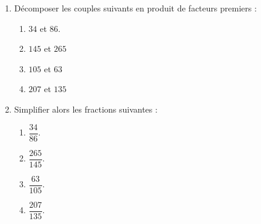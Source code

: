 \begin{exercice*}    
    \begin{enumerate}
        \item Décomposer les couples suivants en produit de facteurs premiers :
        \begin{multicols}{2}                
            \begin{enumerate}
                \item $34$ et $86$.
                \item $145$ et $265$
                \item $105$ et $63$
                \item $207$ et $135$
            \end{enumerate}
        \end{multicols}
        \item Simplifier alors les fractions suivantes :
        \begin{multicols}{2}
            \begin{spacing}{2}
                \begin{enumerate}
                    \item $\dfrac{34}{86}$.
                    \item $\dfrac{265}{145}$.
                    \item $\dfrac{63}{105}$.
                    \item $\dfrac{207}{135}$.
                \end{enumerate}                    
            \end{spacing}
        \end{multicols}
    \end{enumerate}                   
    
\end{exercice*}
